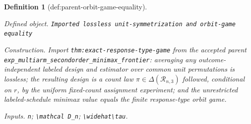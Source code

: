 \documentclass{article}
\newtheorem{definition}{Definition}
\begin{document}
\begin{definition}[def:parent-orbit-game-equality]\label{def:parent-orbit-game-equality}
\par\smallskip\noindent\emph{Defined object.} \texttt{Imported lossless unit-\allowbreak{}symmetrization and orbit-\allowbreak{}game equality}
\par\smallskip\noindent\emph{Construction.} Import \texttt{thm:exact-response-type-game} from the accepted parent \texttt{exp\_multiarm\_secondorder\_minimax\_frontier}: averaging any outcome-independent labeled design and estimator over common unit permutations is lossless; the resulting design is a count law \(\pi\in\Delta(\mathcal R_{n,3})\) followed, conditional on \(r\), by the uniform fixed-count assignment experiment; and the unrestricted labeled-schedule minimax value equals the finite response-type orbit game.
\par\smallskip\noindent\emph{Inputs.} \texttt{n}; \texttt{\textbackslash{}\allowbreak{}mathcal D\_\allowbreak{}n}; \texttt{\textbackslash{}\allowbreak{}widehat\textbackslash{}\allowbreak{}tau}.
\end{definition}
\end{document}
